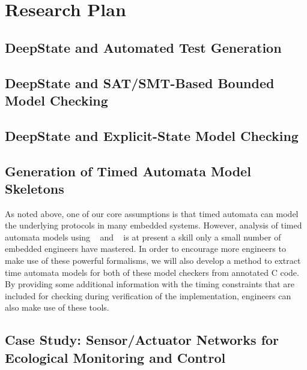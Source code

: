 \section{Research Plan}

%

\subsection{DeepState and Automated Test Generation}
\label{sec:framac2deepstate}


\subsection{DeepState and SAT/SMT-Based Bounded Model Checking}


\subsection{DeepState and Explicit-State Model Checking}


\subsection{Generation of Timed Automata Model Skeletons}
As noted above, one of our core assumptions is that timed automata can
model the underlying protocols in many embedded systems.  However,
analysis of timed automata models using \uppaal~\cite{uppaal} and
\prism~\cite{KNP2011:CAV} is at present a skill only a small number of
embedded engineers have mastered.  In order to encourage more
engineers to make use of these powerful formalisms, we will also
develop a method to extract time automata models for both of these
model checkers from annotated C code.  By providing some additional
information with the timing constraints that are included for
checking during verification of the implementation, engineers can also
make use of these tools.

\subsection{Case Study: Sensor/Actuator Networks for Ecological Monitoring and Control}
\label{sec:case-study}

